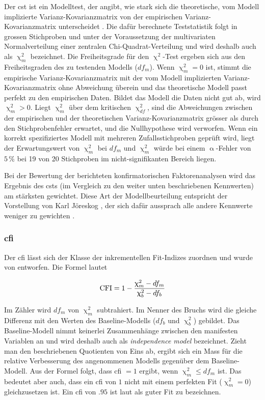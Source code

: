 \documentclass[11pt, twoside, a4paper]{book}		%
\begin{document}
Der \gls{cst} ist ein Modelltest, der angibt, wie stark sich die theoretische, vom Modell implizierte Var\-ianz-Ko\-var\-ianz\-ma\-trix von der empirischen Var\-ianz-Ko\-var\-ianz\-ma\-trix unterscheidet \citep{Kline2011}. Die dafür berechnete Teststatistik folgt in grossen Stichproben und unter der Voraussetzung der multivariaten Normalverteilung einer zentralen Chi-Quad\-rat-Ver\-teil\-ung und wird deshalb auch als $\upchi^2_{m}$ bezeichnet. Die Freiheitsgrade für den $\upchi^2$-Test ergeben sich aus den Freiheitsgraden des zu testenden Modells ($df_{m}$). Wenn $\upchi^2_{m}=0$ ist, stimmt die empirische Var\-ianz-Ko\-var\-ianz\-ma\-trix mit der vom Modell implizierten Varianz-Kovarianzmatrix ohne Abweichung überein und das theoretische Modell passt perfekt zu den empirischen Daten. Bildet das Modell die Daten nicht gut ab, wird $\upchi^2_{m}>0$. Liegt $\upchi^2_{m}$ über dem kritischen $\upchi^2_{df}$, sind die Abweichungen zwischen der empirischen und der theoretischen Varianz-Kovarianzmatrix grösser als durch den Stichprobenfehler erwartet, und die Nullhypothese wird verworfen. Wenn ein korrekt spezifiziertes Modell mit mehreren Zufallsstichproben geprüft wird, liegt der Erwartungswert von $\upchi^2_{m}$ bei $df_{m}$ und $\upchi^2_{m}$ würde bei einem $\upalpha$-Fehler von $5\,\%$ bei 19 von 20 Stichproben im nicht-signifikanten Bereich liegen.

Bei der Bewertung der berichteten konfirmatorischen Faktorenanalysen wird das Ergebnis des \gls{cst}s (im Vergleich zu den weiter unten beschriebenen Kennwerten) am stärksten gewichtet. Diese Art der Modellbeurteilung entspricht der Vorstellung von Karl Jöreskog \citep[][S. 10]{Soerbom2001}, der sich dafür aussprach alle andere Kennwerte weniger zu gewichten \citep[siehe auch][]{Hayduk2007}.

\subsubsection*{\gls{cfi}}
Der \gls{cfi} lässt sich der Klasse der inkrementellen Fit-Indizes zuordnen und wurde von \citet{Bentler1990} entworfen. Die Formel lautet

$$ \textnormal{CFI} = 1 - \frac{\upchi^2_{m}-df_{m}}{\upchi^2_{b}-df_{b}} $$

\noindent Im Zähler wird $df_{m}$ von $\upchi^2_{m}$ subtrahiert. Im Nenner des Bruchs wird die gleiche Differenz mit den Werten des Baseline-Modells ($df_{b}$ und $\upchi^2_{b}$) gebildet.
Das Baseline-Modell nimmt keinerlei Zusammenhänge zwischen den manifesten Variablen an und wird deshalb auch als \textit{independence model} bezeichnet. Zieht man den beschriebenen Quotienten von Eins ab, ergibt sich ein Mass für die relative Verbesserung des angenommenen Modells gegenüber dem Baseline-Modell. Aus der Formel folgt, dass \gls{cfi} $= 1$ ergibt, wenn $\upchi^2_{m} \leq df_{m}$ ist. Das bedeutet aber auch, dass ein \gls{cfi} von $1$ nicht mit einem perfekten Fit ($\upchi^2_{m} = 0$) gleichzusetzen ist. Ein \gls{cfi} von $.95$ ist laut \citet{Hu1999} als guter Fit zu bezeichnen.
\end{document}

